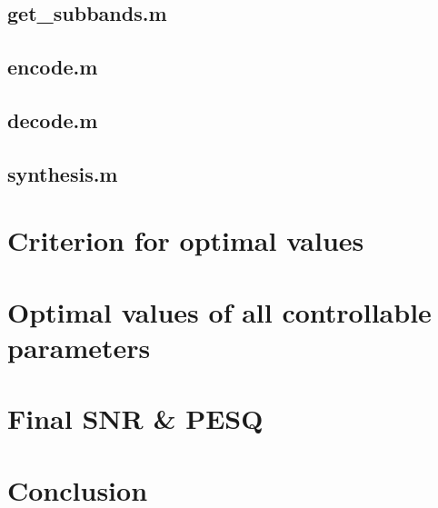 \documentclass[a4paper]{article}
\begin{document}
\subsection{get\_subbands.m}

\subsection{encode.m}

\subsection{decode.m}

\subsection{synthesis.m}

\section{Criterion for optimal values}

\section{Optimal values of all controllable parameters}

\section{Final SNR \& PESQ}

\section{Conclusion}
\end{document}
